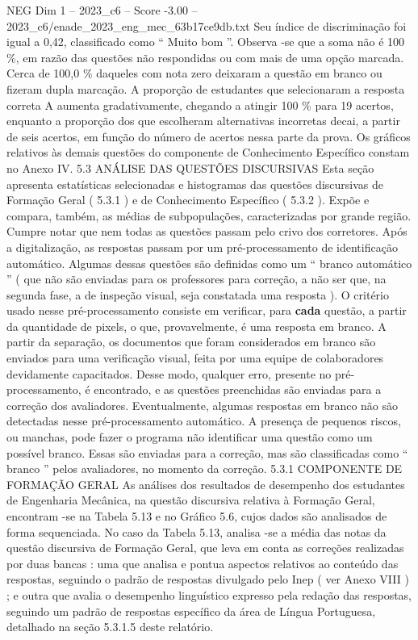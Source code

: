 \begin{textsample}{NEG Dim 1 – 2023\_c6 – Score -3.00 – 2023\_c6/enade\_2023\_eng\_mec\_63b17ce9db.txt}
Seu índice de discriminação foi igual a 0,42, classificado como “ Muito bom ”.
Observa -se que a soma não é 100 \%, em razão das questões não respondidas ou com mais de uma opção marcada.
Cerca de 100,0 \% daqueles com nota zero deixaram a questão em branco ou fizeram dupla marcação.
A proporção de estudantes que selecionaram a resposta correta A aumenta gradativamente, chegando a atingir 100 \% para 19 acertos, enquanto a proporção dos que escolheram alternativas incorretas decai, a partir de seis acertos, em função do número de acertos nessa parte da prova.
Os gráficos relativos às demais questões do componente de Conhecimento Específico constam no Anexo IV. 5.3 ANÁLISE DAS QUESTÕES DISCURSIVAS Esta seção apresenta estatísticas selecionadas e histogramas das questões discursivas de Formação Geral ( 5.3.1 ) e de Conhecimento Específico ( 5.3.2 ).
Expõe e compara, também, as médias de subpopulações, caracterizadas por grande região.
Cumpre notar que nem todas as questões passam pelo crivo dos corretores.
Após a digitalização, as respostas passam por um pré-processamento de identificação automático.
Algumas dessas questões são definidas como um “ branco automático ” ( que não são enviadas para os professores para correção, a não ser que, na segunda fase, a de inspeção visual, seja constatada uma resposta ).
O critério usado nesse pré-processamento consiste em verificar, para \textbf{cada} questão, a partir da quantidade de pixels, o que, provavelmente, é uma resposta em branco.
A partir da separação, os documentos que foram considerados em branco são enviados para uma verificação visual, feita por uma equipe de colaboradores devidamente capacitados.
Desse modo, qualquer erro, presente no pré-processamento, é encontrado, e as questões preenchidas são enviadas para a correção dos avaliadores.
Eventualmente, algumas respostas em branco não são detectadas nesse pré-processamento automático.
A presença de pequenos riscos, ou manchas, pode fazer o programa não identificar uma questão como um possível branco.
Essas são enviadas para a correção, mas são classificadas como “ branco ” pelos avaliadores, no momento da correção. 5.3.1 COMPONENTE DE FORMAÇÃO GERAL As análises dos resultados de desempenho dos estudantes de Engenharia Mecânica, na questão discursiva relativa à Formação Geral, encontram -se na Tabela 5.13 e no Gráfico 5.6, cujos dados são analisados de forma sequenciada.
No caso da Tabela 5.13, analisa -se a média das notas da questão discursiva de Formação Geral, que leva em conta as correções realizadas por duas bancas : uma que analisa e pontua aspectos relativos ao conteúdo das respostas, seguindo o padrão de respostas divulgado pelo Inep ( ver Anexo VIII ) ; e outra que avalia o desempenho linguístico expresso pela redação das respostas, seguindo um padrão de respostas específico da área de Língua Portuguesa, detalhado na seção 5.3.1.5 deste relatório.

\end{textsample}

